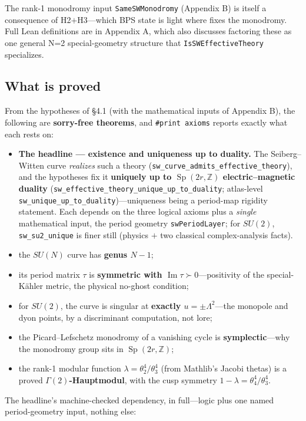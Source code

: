\documentclass[11pt]{article}
\newcommand{\Z}{\mathbb{Z}}
\newcommand{\Sp}{\operatorname{Sp}}
\newcommand{\Imag}{\operatorname{Im}}
\newcommand{\code}[1]{\texttt{#1}}
\begin{document}
The rank-1 monodromy input \code{SameSWMonodromy} (Appendix B) is itself a consequence of
H2$+$H3---which BPS state is light where fixes the monodromy. Full Lean definitions are in
Appendix A, which also discusses factoring these as one general N=2 special-geometry structure that
\code{IsSWEffectiveTheory} specializes.

\subsection{What is proved}

From the hypotheses of \S4.1 (with the mathematical inputs of Appendix B), the following are
\textbf{sorry-free theorems}, and \code{\#print axioms} reports exactly what each rests on:

\begin{itemize}
\item \textbf{The headline --- existence and uniqueness up to duality.} The Seiberg--Witten curve
\emph{realizes} such a theory (\code{sw\_curve\_admits\_\allowbreak effective\_theory}), and the
hypotheses fix it \textbf{uniquely up to $\Sp(2r,\Z)$ electric--magnetic duality}
(\code{sw\_effective\_theory\_\allowbreak unique\_up\_to\_duality}; atlas-level
\code{sw\_unique\_up\_to\_duality})---uniqueness being a period-map rigidity statement. Each depends
on the three logical axioms plus a \emph{single} mathematical input, the period geometry
\code{swPeriodLayer}; for $SU(2)$, \code{sw\_su2\_unique} is finer still (physics $+$ two classical
complex-analysis facts).
\item the $SU(N)$ curve has \textbf{genus $N-1$};
\item its period matrix $\tau$ is \textbf{symmetric with $\Imag\tau \succ 0$}---positivity of the
special-K\"ahler metric, the physical no-ghost condition;
\item for $SU(2)$, the curve is singular at \textbf{exactly $u = \pm\Lambda^2$}---the monopole and
dyon points, by a discriminant computation, not lore;
\item the Picard--Lefschetz monodromy of a vanishing cycle is \textbf{symplectic}---why the
monodromy group sits in $\Sp(2r,\Z)$;
\item the rank-1 modular function $\lambda = \theta_2^4/\theta_3^4$ (from Mathlib's Jacobi thetas)
is a proved \textbf{$\Gamma(2)$-Hauptmodul}, with the cusp symmetry
$1-\lambda = \theta_4^4/\theta_3^4$.
\end{itemize}

The headline's machine-checked dependency, in full---logic plus one named period-geometry input,
nothing else:
\end{document}
